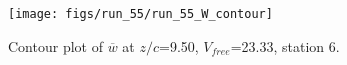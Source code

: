 \begin{figure}[H]
\centering
\texttt{[image: figs/run\_55/run\_55\_W\_contour]}
\caption{Contour plot of $\overline{w}$ at $z/c$=9.50, $V_{free}$=23.33, station 6.}
\label{fig:run_55_W_contour}
\end{figure}


